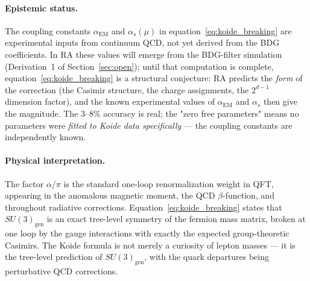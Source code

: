 \documentclass[11pt,a4paper]{article}
\begin{document}
\paragraph{Epistemic status.}
The coupling constants $\alpha_{\mathrm{EM}}$ and $\alpha_s(\mu)$ in
equation~\eqref{eq:koide_breaking} are experimental inputs from continuum
QCD, not yet derived from the BDG coefficients. In RA these values will
emerge from the BDG-filter simulation (Derivation~1 of Section~\ref{sec:open});
until that computation is complete, equation~\eqref{eq:koide_breaking}
is a structural conjecture: RA predicts the \emph{form} of the correction
(the Casimir structure, the charge assignments, the $2^{d-1}$ dimension
factor), and the known experimental values of $\alpha_{\mathrm{EM}}$ and
$\alpha_s$ then give the magnitude. The 3--8\% accuracy is real;
the "zero free parameters" means no parameters were \emph{fitted to Koide
data specifically} --- the coupling constants are independently known.

\paragraph{Physical interpretation.}
The factor $\alpha/\pi$ is the standard one-loop renormalization weight
in QFT, appearing in the anomalous magnetic moment, the QCD $\beta$-function,
and throughout radiative corrections. Equation~\eqref{eq:koide_breaking} states
that $SU(3)_{\mathrm{gen}}$ is an exact tree-level symmetry of the fermion
mass matrix, broken at one loop by the gauge interactions with exactly the
expected group-theoretic Casimirs. The Koide formula is not merely a
curiosity of lepton masses --- it is the tree-level prediction of
$SU(3)_{\mathrm{gen}}$, with the quark departures being perturbative
QCD corrections.
\end{document}
